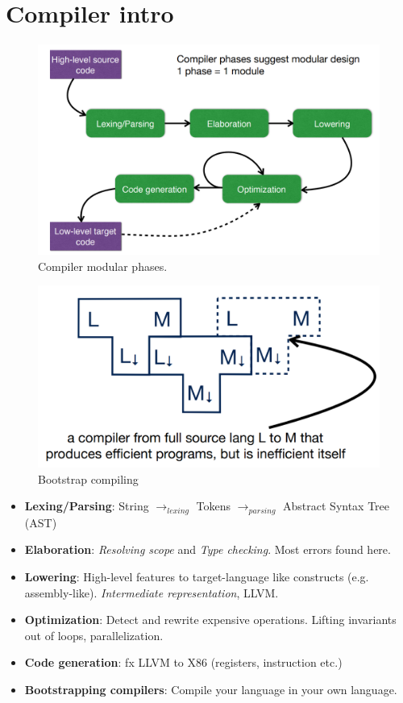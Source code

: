 \section{Compiler intro}

\begin{figure}[h]
    \centering
    \includegraphics[scale=0.4]{assets/phases.png}
    \caption{Compiler modular phases.}
    \label{fig:phase}
\end{figure}

\begin{figure}[h]
    \centering
    \includegraphics[scale=0.4]{assets/bootstrap_compile.png}
    \caption{Bootstrap compiling}
    \label{fig:bootstrap}
\end{figure}

\begin{itemize}
    \item \textbf{Lexing/Parsing}: String $\rightarrow_{lexing}$ Tokens $\rightarrow_{parsing}$ Abstract Syntax Tree (AST)
    \item \textbf{Elaboration}: \textit{Resolving scope }and \textit{Type checking}. Most errors found here.
    \item \textbf{Lowering}: High-level features to target-language like constructs (e.g. assembly-like). \textit{Intermediate representation}, LLVM.
    \item \textbf{Optimization}: Detect and rewrite expensive operations. Lifting invariants out of loops, parallelization.
    \item \textbf{Code generation}: fx LLVM to X86 (registers, instruction etc.)
    \item \textbf{Bootstrapping compilers}: Compile your language in your own language.
\end{itemize}